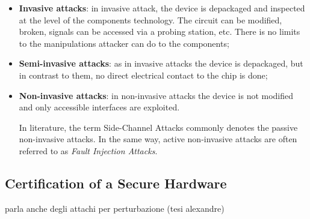 \begin{itemize}
\item[] \textbf{Invasive attacks}: in invasive attack, the device is depackaged and inspected at the level of the components technology. The circuit can be modified, broken, signals can be accessed via a probing station, etc. There is no limits to the manipulations attacker can do to the components;
\item[] \textbf{Semi-invasive attacks}: as in invasive attacks the device is depackaged, but in contrast to them, no direct electrical contact to the chip is done;
\item[] \textbf{Non-invasive attacks}: in non-invasive attacks the device is not modified and only accessible interfaces are exploited. 

In literature, the term Side-Channel Attacks commonly denotes the passive non-invasive attacks. In the same way, active non-invasive attacks are often referred to as \emph{Fault Injection Attacks}. 

\end{itemize}

\subsection{Certification of a Secure Hardware}

parla anche degli attachi per perturbazione (tesi alexandre)


